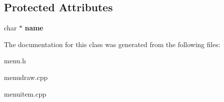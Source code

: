 \subsection*{Protected Attributes}
\begin{DoxyCompactItemize}
\item 
\hypertarget{classmenuitem_a8b41220a5636c9fb902efbf7499e18f0}{char $\ast$ {\bfseries name}}\label{classmenuitem_a8b41220a5636c9fb902efbf7499e18f0}

\end{DoxyCompactItemize}


The documentation for this class was generated from the following files\-:\begin{DoxyCompactItemize}
\item 
menu.\-h\item 
menudraw.\-cpp\item 
menuitem.\-cpp\end{DoxyCompactItemize}
